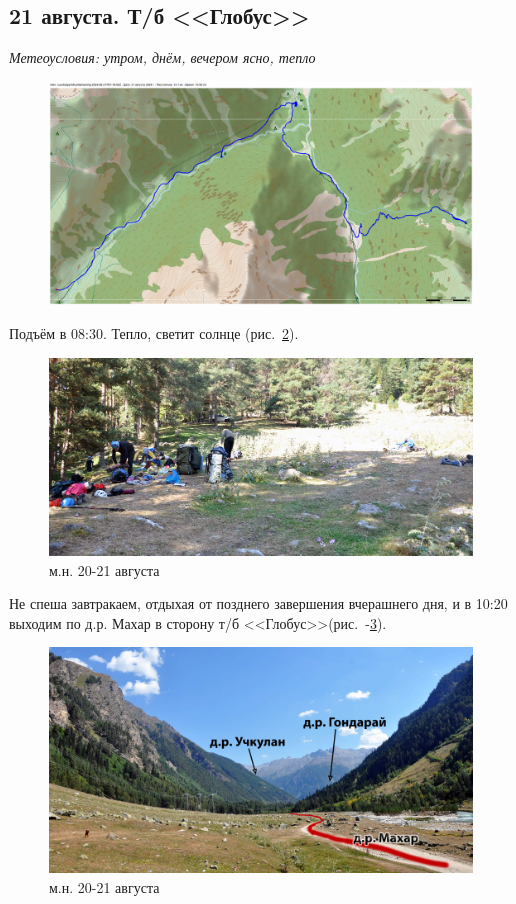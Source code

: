\subsection{21 августа. Т/б <<Глобус>>}

\textit{Метеоусловия: утром, днём, вечером ясно, тепло}


\begin{figure}[h!]
	\centering
	\includegraphics[angle=0, width=0.7\linewidth]{../pics/mini_maps/21}
	\label{fig:mini_21}
\end{figure}

Подъём в 08:30. Тепло, светит солнце (рис.~\ref{fig:DSC_0993}). 

\begin{figure}[h]
	\centering
	\includegraphics[width=0.7\linewidth]{../pics/DSC_0993}
	\caption{м.н. 20-21 августа}
	\label{fig:DSC_0993}
\end{figure}

Не спеша завтракаем, отдыхая от позднего завершения вчерашнего дня, и в 10:20 выходим по д.р. Махар в сторону т/б <<Глобус>>(рис.~-\ref{fig:DSC_1003}). 

\begin{figure}[h]
	\centering
	\includegraphics[width=0.7\linewidth]{../pics/DSC_1003}
	\caption{м.н. 20-21 августа}
	\label{fig:DSC_1003}
\end{figure}

